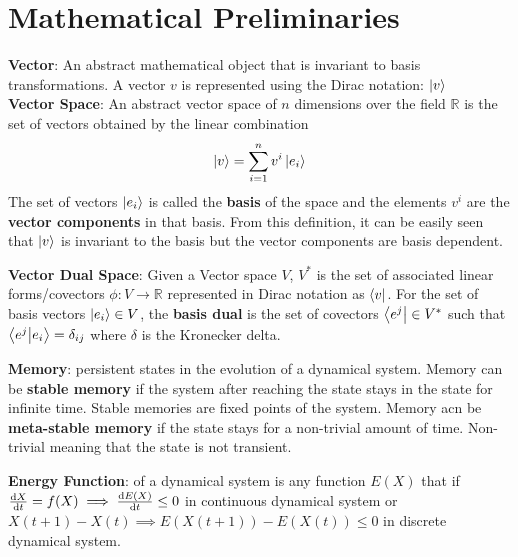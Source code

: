 \documentclass[11pt]{article}
\theoremstyle{definition}
\begin{document}
	\begin{center}
	\end{center}
	\vspace*{1mm}

    \section{Mathematical Preliminaries}
    
\textbf{Vector}: An abstract mathematical object that is invariant to basis transformations. A vector $v$ is represented using the Dirac notation: $\ket{v}$ \\

\textbf{Vector Space}: An abstract vector space of $n$ dimensions over the field $\mathbb{R}$ is the set of vectors obtained by the linear combination
\begin{dmath}
    \ket{v} = \sum_{i=1}^n v^i \ket{e_i}
\end{dmath}
The set of vectors $\ket{e_i}$ is called the \textbf{basis} of the space and the elements $v^i$ are the \textbf{vector components} in that basis. From this definition, it can be easily seen that $\ket{v}$ is invariant to the basis but the vector components are basis dependent.

\textbf{Vector Dual Space}: Given a Vector space $V$, $V^*$ is the set of associated linear forms/covectors $\phi: V \rightarrow \mathbb{R}$ represented in Dirac notation as $\bra{v}$. For the set of basis vectors $\ket{e_i} \in V$, the \textbf{basis dual} is the set of covectors $\bra{e^j} \in V^*$ such that $\bra{e^j} \ket{e_i} = \delta_{i j}$ where $\delta$ is the Kronecker delta.

\textbf{Memory}: persistent states in the evolution of a dynamical system. Memory can be \textbf{stable memory} if the system after reaching the state stays in the state for infinite time. Stable memories are fixed points of the system. Memory acn be \textbf{meta-stable memory} if the state stays for a non-trivial amount of time. Non-trivial meaning that the state is not transient.

\textbf{Energy Function}: of a dynamical system is any function $E(X)$ that if $\dv{X}{t} = f(X) \implies \dv{E(X)}{t} \leq 0$ in continuous dynamical system or $X(t+1) - X(t) \implies E(X(t+1)) - E(X(t)) \leq 0$ in discrete dynamical system.
\end{document}
